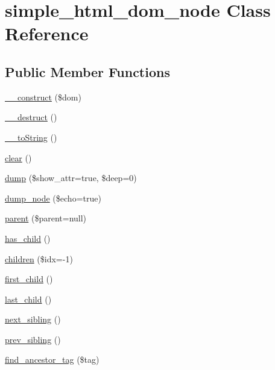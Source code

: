 \hypertarget{classsimple__html__dom__node}{}\section{simple\+\_\+html\+\_\+dom\+\_\+node Class Reference}
\label{classsimple__html__dom__node}
\subsection*{Public Member Functions}
\begin{DoxyCompactItemize}
\item 
\hyperlink{classsimple__html__dom__node_aac23fa1150ef19e7f28c0cf2d9e31086}{\+\_\+\+\_\+construct} (\$dom)
\item 
\hyperlink{classsimple__html__dom__node_a421831a265621325e1fdd19aace0c758}{\+\_\+\+\_\+destruct} ()
\item 
\hyperlink{classsimple__html__dom__node_a7516ca30af0db3cdbf9a7739b48ce91d}{\+\_\+\+\_\+to\+String} ()
\item 
\hyperlink{classsimple__html__dom__node_aa821bec12eaa7e0f649397c9675ff505}{clear} ()
\item 
\hyperlink{classsimple__html__dom__node_ad15ceec0aa0d3e1c5ca8c7bd6aebe80b}{dump} (\$show\+\_\+attr=true, \$deep=0)
\item 
\hyperlink{classsimple__html__dom__node_a38121751fa4d30226afcf3011e596f5e}{dump\+\_\+node} (\$echo=true)
\item 
\hyperlink{classsimple__html__dom__node_a3e5906e2b6a1b4338f3e59d818657b08}{parent} (\$parent=null)
\item 
\hyperlink{classsimple__html__dom__node_abcbaf3b1869134816ac74a07ee2242f1}{has\+\_\+child} ()
\item 
\hyperlink{classsimple__html__dom__node_a42d02529839611cba362c6b5ce58f719}{children} (\$idx=-\/1)
\item 
\hyperlink{classsimple__html__dom__node_ade851eb21476ec16857ed56d166f6afc}{first\+\_\+child} ()
\item 
\hyperlink{classsimple__html__dom__node_a97160a76243a59b48b26e6d96b07b6ea}{last\+\_\+child} ()
\item 
\hyperlink{classsimple__html__dom__node_ade0fb39187948a5a6772dfc30252f8f8}{next\+\_\+sibling} ()
\item 
\hyperlink{classsimple__html__dom__node_acea92e7c0be16e44d15cc502cec229d8}{prev\+\_\+sibling} ()
\item 
\hyperlink{classsimple__html__dom__node_a03d7c0efb45d013cc1421612c719e867}{find\+\_\+ancestor\+\_\+tag} (\$tag)

\end{DoxyCompactItemize}
